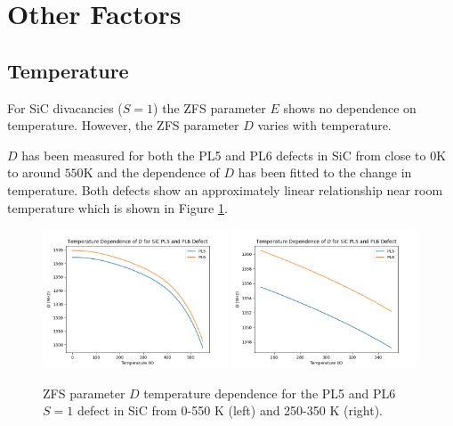 \section{Other Factors}
\subsection{Temperature}\label{D_vs_temp}
For SiC divacancies ($S=1$) the ZFS parameter $E$ shows no dependence on temperature. However, the ZFS parameter $D$ varies with temperature.

$D$ has been measured for both the PL5 and PL6 defects in SiC from close to $0$K to around $550$K and the dependence of $D$ has been fitted to the change in temperature.
Both defects show an approximately linear relationship near room temperature which is shown in Figure \ref{fig:PL5PL6DvsT}.


\begin{figure}[H]
	\begin{center}
		\includegraphics[width=0.49\textwidth]{figures/SiC-PL5PL6-D(T).png}
		\includegraphics[width=0.49\textwidth]{figures/SiC-PL5PL6-D(T)-close.png}
		\caption{ZFS parameter $D$ temperature dependence for the PL5 and PL6 $S=1$ defect in SiC from 0-550 K (left) and 250-350 K (right). }\label{fig:PL5PL6DvsT}
	\end{center}
\end{figure}

